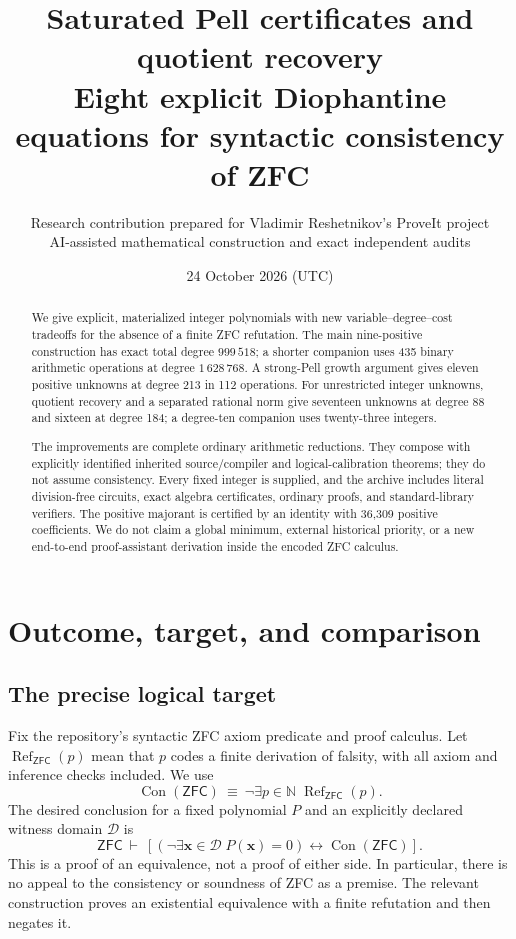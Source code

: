 \documentclass[11pt,a4paper]{article}
\title{\vspace{-12mm}\textbf{Saturated Pell certificates and quotient recovery}\\[3mm]
  \large Eight explicit Diophantine equations for syntactic consistency of ZFC}
\author{\normalsize Research contribution prepared for Vladimir Reshetnikov's ProveIt project\\
  \small AI-assisted mathematical construction and exact independent audits}
\date{24 October 2026 (UTC)}
\newcommand{\N}{\mathbb N}
\newcommand{\ConZFC}{\operatorname{Con}(\mathsf{ZFC})}
\newcommand{\RefZFC}{\operatorname{Ref}_{\mathsf{ZFC}}}
\theoremstyle{definition}
\theoremstyle{remark}
\numberwithin{equation}{section}
\begin{document}
\maketitle
\thispagestyle{plain}

\begin{abstract}
We give explicit, materialized integer polynomials with new variable--degree--cost
tradeoffs for the absence of a finite ZFC refutation. The main nine-positive
construction has exact total degree \(999\,518\); a shorter companion uses
435 binary arithmetic operations at degree \(1\,628\,768\). A strong-Pell
growth argument gives eleven positive unknowns at degree 213 in 112 operations.
For unrestricted integer unknowns, quotient recovery and a separated rational
norm give seventeen unknowns at degree 88 and sixteen at degree 184; a
degree-ten companion uses twenty-three integers.

The improvements are complete ordinary arithmetic reductions. They compose
with explicitly identified inherited source/compiler and logical-calibration
theorems; they do not assume consistency. Every fixed integer is supplied,
and the archive includes literal division-free circuits, exact algebra
certificates, ordinary proofs, and standard-library verifiers. The positive
majorant is certified by an identity with 36,309 positive coefficients.
We do not claim a global minimum, external historical priority, or a new
end-to-end proof-assistant derivation inside the encoded ZFC calculus.
\end{abstract}

\section{Outcome, target, and comparison}
\label{sec:outcome}

\subsection{The precise logical target}

Fix the repository's syntactic ZFC axiom predicate and proof calculus. Let
\(\RefZFC(p)\) mean that \(p\) codes a finite derivation of falsity, with
all axiom and inference checks included. We use
\[
 \ConZFC\ \equiv\ \neg\exists p\in\N\;\RefZFC(p).
\]
The desired conclusion for a fixed polynomial \(P\) and an explicitly
declared witness domain \(\mathcal D\) is
\begin{equation}
 \mathsf{ZFC}\ \vdash\
 \left[
   \left(\neg\exists\mathbf x\in\mathcal D\;P(\mathbf x)=0\right)
   \longleftrightarrow \ConZFC
 \right].
 \label{eq:target}
\end{equation}
This is a proof of an equivalence, not a proof of either side. In particular,
there is no appeal to the consistency or soundness of ZFC as a premise.
The relevant construction proves an existential equivalence with a finite
refutation and then negates it.
\end{document}
